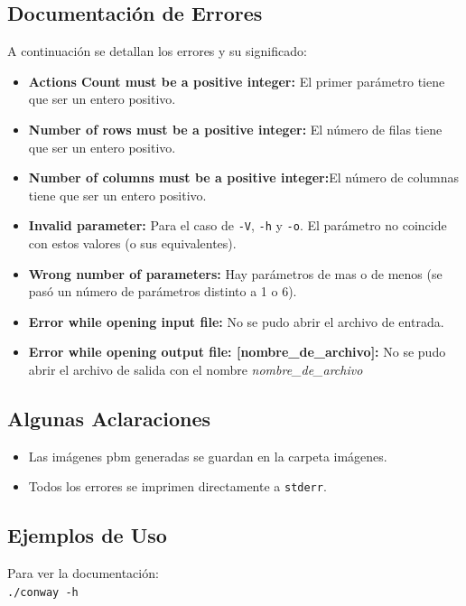 \documentclass[11pt,a4paper]{article}
\begin{document}
\subsection{Documentación de Errores}
A continuación se detallan los errores y su significado:
\begin{itemize}
	\item \textbf{Actions Count must be a positive integer:} El primer parámetro tiene que ser un entero positivo.
	\item \textbf{Number of rows must be a positive integer:} El número de filas tiene que ser un entero positivo.
	\item \textbf{Number of columns must be a positive integer:}El número de columnas tiene que ser un entero positivo.
	\item \textbf{Invalid parameter:} Para el caso de \texttt{-V}, \texttt{-h} y \texttt{-o}. El parámetro no coincide con estos valores (o sus equivalentes).
	\item \textbf{Wrong number of parameters:} Hay parámetros de mas o de menos (se pasó un número de parámetros distinto a 1 o 6).
	\item \textbf{Error while opening input file:} No se pudo abrir el archivo de entrada.
	\item \textbf{Error while opening output file: [nombre\_de\_archivo]:} No se pudo abrir el archivo de salida con el nombre \emph{nombre\_de\_archivo}
\end{itemize}



\subsection{Algunas Aclaraciones}
\begin{itemize}
	\item Las imágenes pbm generadas se guardan en la carpeta imágenes.
	\item Todos los errores se imprimen directamente a \texttt{stderr}.
	
\end{itemize}

\subsection{Ejemplos de Uso}

Para ver la documentación:\\

\texttt{./conway -h}\\
\end{document}
